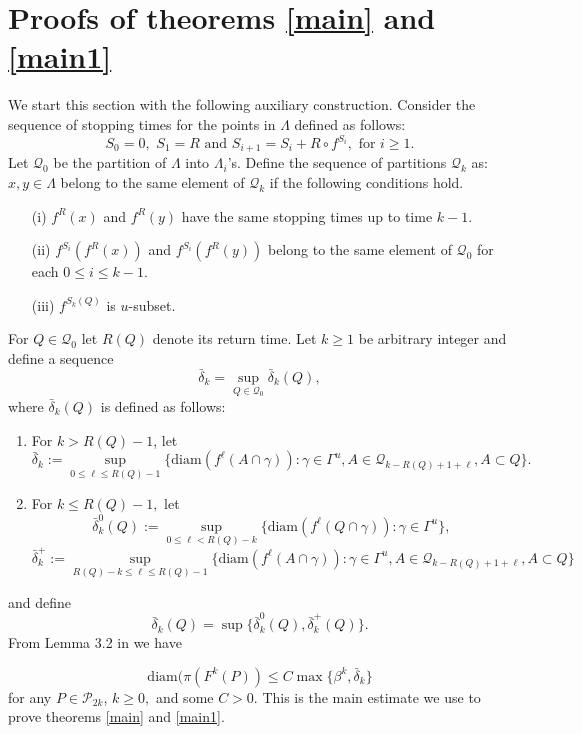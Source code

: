 \documentclass[a4paper,12pt]{amsart}
\numberwithin{equation}{section}
\begin{document}
\section{Proofs of theorems \ref{main} and \ref{main1}}
We start this section with the following auxiliary construction.
Consider the sequence of stopping times for the points in $\Lambda$
defined as follows:
\begin{equation}
S_0=0, \,\, S_1=R\,\,\text{and}\,\, S_{i+1}=S_i+R\circ f^{S_i},\,\,
\text{for} \,\, i\ge 1.
\end{equation}
Let $\mathcal Q_0$ be the partition of $\Lambda$ into
$\Lambda_{i}$'s. Define the sequence of partitions  $\mathcal Q_k$
as:
 $x, y\in\Lambda$ belong to the same element of $\mathcal Q_k$ if
the following conditions hold.
\begin{itemize}
\item[(i)] $f^R(x)$ and $f^R(y)$ have the same stopping times
 up to time $k-1.$
 \item[(ii)] $f^{S_i}(f^R(x))$ and $f^{S_i}(f^R(y))$ belong to the same
 element of $\mathcal Q_0$ for each $0\le i\le k-1.$
 \item[(iii)] $f^{S_k(Q)}$ is $u$-subset.
\end{itemize}
For $Q\in\mathcal Q_0$ let $R(Q)$ denote its return time. Let $k\ge
1$ be arbitrary integer and define  a sequence
$$\bar\delta_k=\sup_{Q\in\mathcal Q_0}\bar\delta_k(Q),$$ where $\bar\delta_k(Q)$ is
defined as follows:
\begin{enumerate}
\item For $k>R(Q)-1$,  let
$$\bar\delta_k:=\sup_{0\le \ell\le R(Q)-1}
\{\text{diam}(f^\ell(A\cap\gamma)):\gamma\in \Gamma^u, A\in\mathcal
Q_{k-R(Q)+1+\ell}, A\subset Q\}.$$

\item For $k\le R(Q)-1,$  let
$$\bar\delta_k^0(Q):=\sup_{0\le \ell <R(Q)-k}
\{\text{diam}(f^\ell(Q\cap\gamma)):\gamma\in\Gamma^u\},$$
$$\bar\delta_k^+:=\sup_{R(Q)-k \le \ell\le R(Q)-1}
\{\text{diam}(f^\ell(A\cap\gamma)):\gamma\in \Gamma^u, A\in\mathcal
Q_{k-R(Q)+1+\ell}, A\subset Q\}$$
\end{enumerate}
and  define $$\bar\delta_k(Q)=\sup\{\bar\delta_k^0(Q),
\bar\delta_k^+(Q)\}.$$ From Lemma 3.2 in  \cite{AlvPin} we have

\begin{equation}\label{diameter}
 \text{diam}(\pi(F^k(P))\le C\max\{\beta^k,
\bar\delta_k\} \end{equation} for any $P\in\mathcal P_{2k}$, $k\ge 0,$ and some
$C>0.$ This is the main estimate we use to prove theorems \ref{main}
and \ref{main1}.
\end{document}
